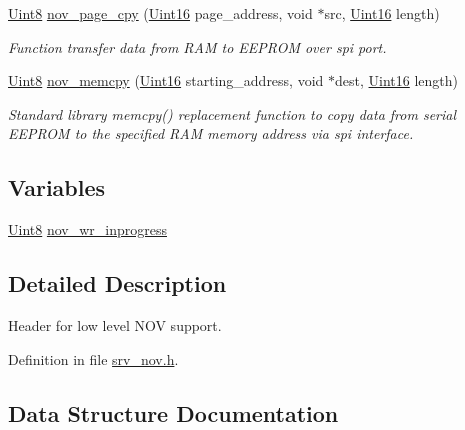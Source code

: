 \begin{DoxyCompactItemize}
\hyperlink{a00072_af84840501dec18061d18a68c162a8fa2}{Uint8} \hyperlink{a00029_aeb021b0e002db120ad733c24f3e179bc}{nov\+\_\+page\+\_\+cpy} (\hyperlink{a00072_a59a9f6be4562c327cbfb4f7e8e18f08b}{Uint16} page\+\_\+address, void $\ast$src, \hyperlink{a00072_a59a9f6be4562c327cbfb4f7e8e18f08b}{Uint16} length)
\begin{DoxyCompactList}\small\item\em Function transfer data from R\+A\+M to E\+E\+P\+R\+O\+M over spi port. \end{DoxyCompactList}\item 
\hyperlink{a00072_af84840501dec18061d18a68c162a8fa2}{Uint8} \hyperlink{a00029_a3ff681f3af83ec441535611dac6ada16}{nov\+\_\+memcpy} (\hyperlink{a00072_a59a9f6be4562c327cbfb4f7e8e18f08b}{Uint16} starting\+\_\+address, void $\ast$dest, \hyperlink{a00072_a59a9f6be4562c327cbfb4f7e8e18f08b}{Uint16} length)
\begin{DoxyCompactList}\small\item\em Standard library memcpy() replacement function to copy data from serial E\+E\+P\+R\+O\+M to the specified R\+A\+M memory address via spi interface. \end{DoxyCompactList}\end{DoxyCompactItemize}
\subsection*{Variables}
\begin{DoxyCompactItemize}
\item 
\hyperlink{a00072_af84840501dec18061d18a68c162a8fa2}{Uint8} \hyperlink{a00029_a56fe014653ebdce270aeac664bf86e65}{nov\+\_\+wr\+\_\+inprogress}
\end{DoxyCompactItemize}


\subsection{Detailed Description}
Header for low level N\+O\+V support. 



Definition in file \hyperlink{a00029_source}{srv\+\_\+nov.\+h}.



\subsection{Data Structure Documentation}
\label{d0/d1c/a00605}
\hypertarget{a00029_d0/d1c/a00605}{}
